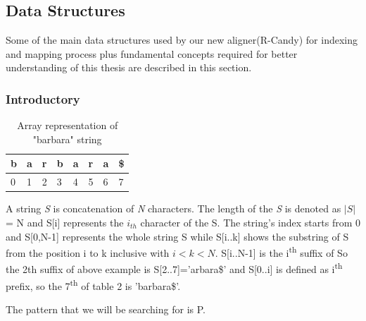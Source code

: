 \documentclass[11pt,a4paper]{report}
\begin{document}



\subsection{Data Structures}  \label{Data Structures}

Some of the main data structures used by our new aligner(R-Candy) for indexing and mapping process plus fundamental concepts required for better understanding of this thesis are described in this section. 

\subsubsection{Introductory} \label{Introductory}

\begin{table}[h]
 \centering
  \begin{tabular}{ | p{0.5cm} | p{0.5cm} | p{0.5cm} |p{0.5cm} |p{0.5cm} |p{0.5cm} |p{0.5cm} |p{0.5cm} |}
    \hline
  \textbf{b} & \textbf{a } &\textbf{r}  &\textbf{b} &\textbf{a} &\textbf{r} &\textbf{a} &\textbf{\$}\\ \hline
       0 & 1 &2&3&4&5&6&7 \\ \hline
      
   \end{tabular}
\caption{Array representation of "barbara" string}
\label{Array-representation}
\end{table}




A string \emph{S} is concatenation of \emph{N} characters. 
The length of the \emph{S} is denoted as $\lvert S \rvert$ = N and S[i] represents the $i_{th}$ character of the S.
The string's index starts from 0 and S[0,N-1] represents the whole string S while S[i..k] shows the substring of S from the position i to k inclusive with $i < k < N$. 
S[i..N-1] is the i\textsuperscript{th} suffix of So the 2th suffix of above example is S[2..7]='arbara\$' and
 S[0..i] is defined as i\textsuperscript{th} prefix, so the 7\textsuperscript{th} of table 2 is 'barbara\$'.
 
The pattern that we will be searching for is P.
\end{document}
